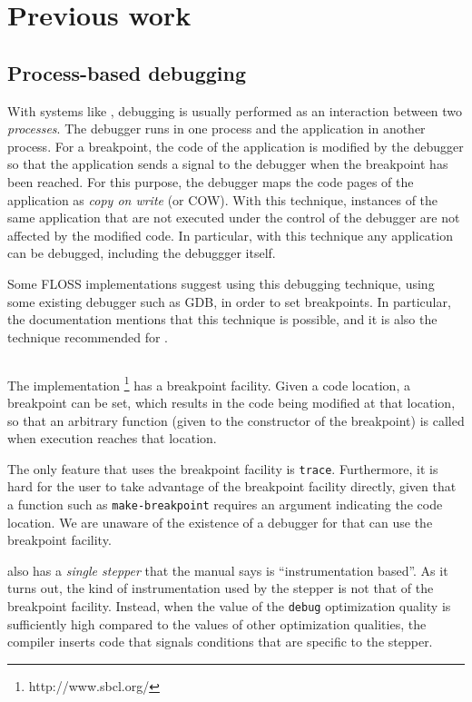 \section{Previous work}

\subsection{Process-based debugging}

With systems like \unix{}, debugging is usually performed as an
interaction between two \emph{processes}.  The debugger runs in one
process and the application in another process.  For a breakpoint, the
code of the application is modified by the debugger so that the
application sends a signal to the debugger when the breakpoint has
been reached.  For this purpose, the debugger maps the code pages of
the application as \emph{copy on write} (or COW).  With this
technique, instances of the same application that are not executed
under the control of the debugger are not affected by the modified
code.  In particular, with this technique any application can be
debugged, including the debuggger itself.

Some FLOSS \commonlisp{} implementations suggest using this debugging
technique, using some existing debugger such as GDB, in order to set
breakpoints.  In particular, the \ccl{} documentation mentions that
this technique is possible, and it is also the technique recommended
for \ecl{}.

\subsection{\sbcl{}}

The \sbcl{} \commonlisp{} implementation%
\footnote{http://www.sbcl.org/}
has a breakpoint facility.  Given a code location, a breakpoint can be
set, which results in the code being modified at that location, so
that an arbitrary function (given to the constructor of the
breakpoint) is called when execution reaches that location.

The only feature that uses the breakpoint facility is \texttt{trace}.
Furthermore, it is hard for the user to take advantage of the
breakpoint facility directly, given that a function such as
\texttt{make-breakpoint} requires an argument indicating the code
location.  We are unaware of the existence of a debugger for \sbcl{}
that can use the breakpoint facility.

\sbcl{} also has a \emph{single stepper} that the manual says is
``instrumentation based''.  As it turns out, the kind of
instrumentation used by the stepper is not that of the breakpoint
facility.  Instead, when the value of the \texttt{debug} optimization
quality is sufficiently high compared to the values of other
optimization qualities, the compiler inserts code that signals
conditions that are specific to the stepper.


